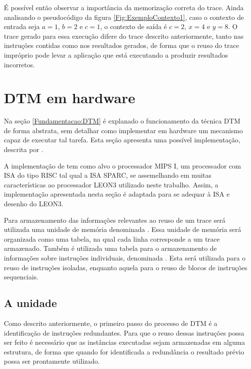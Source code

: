 É possível então observar a importância da memorização correta do trace. Ainda analisando o pseudocódigo da figura \ref{Fig:ExemploContexto1}, caso o contexto de entrada seja $a = 1$, $b = 2$ e $c = 1$, o contexto de saída é $c = 2$, $x = 4$ e $y = 8$. O trace gerado para essa execução difere do trace descrito anteriormente, tanto nas instruções contidas como nos resultados gerados, de forma que o reuso do trace impróprio pode levar a aplicação que está executando a produzir resultados incorretos.

\section{DTM em hardware}
\label{Fundamentacao:DTMHardware}

Na seção \ref{Fundamentacao:DTM} é explanado o funcionamento da técnica DTM de forma abstrata, sem detalhar como implementar em hardware um mecanismo capaz de executar tal tarefa. Esta seção apresenta uma possível implementação, descrita por .

A implementação de  tem como alvo o processador MIPS I, um processador com ISA do tipo RISC tal qual a ISA SPARC, se assemelhando em muitas características ao processador LEON3 utilizado neste trabalho. Assim, a implementação apresentada nesta seção é adaptada para se adequar à ISA e desenho do LEON3.

Para armazenamento das informações relevantes ao reuso de um trace será utilizada uma unidade de memória denominada \tablet. Essa unidade de memória será organizada como uma tabela, na qual cada linha corresponde a um trace armazenado. Também é utilizada uma tabela para o armazenamento de informações sobre instruções individuais, denominada \tableg. Esta será utilizada para o reuso de instruções isoladas, enquanto aquela para o reuso de blocos de instruções sequenciais.

\subsection{A unidade \tableg}
\label{Fundamentacao:DTMHardware:TableG}

Como descrito anteriormente, o primeiro passo do processo de DTM é a identificação de instruções redundantes. Para que o reuso dessas instruções possa ser feito é necessário que as instâncias executadas sejam armazenadas em alguma estrutura, de forma que quando for identificada a redundância o resultado prévio possa ser prontamente utilizado.

